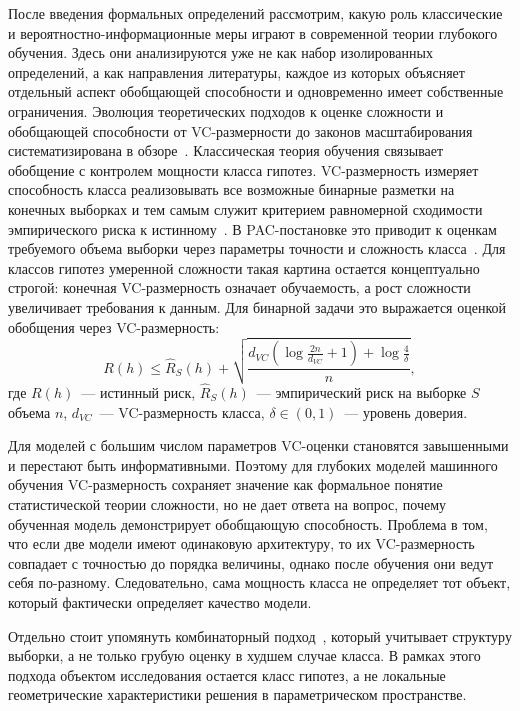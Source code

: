 После введения формальных определений рассмотрим, какую роль классические и вероятностно-информационные меры играют в современной теории глубокого обучения.
Здесь они анализируются уже не как набор изолированных определений, а как направления литературы, каждое из которых объясняет отдельный аспект обобщающей способности и одновременно имеет собственные ограничения.
Эволюция теоретических подходов к оценке сложности и обобщающей способности от VC-размерности до законов масштабирования систематизирована в обзоре~\cite{grabovoy2026vc}.
Классическая теория обучения связывает обобщение с контролем мощности класса гипотез.
VC-размерность измеряет способность класса реализовывать все возможные бинарные разметки на конечных выборках и тем самым служит критерием равномерной сходимости эмпирического риска к истинному~\cite{vapnik1974StatTheory}.
В PAC-постановке это приводит к оценкам требуемого объема выборки через параметры точности и сложность класса~\cite{valiant1984LearnableTheory}.
Для классов гипотез умеренной сложности такая картина остается концептуально строгой: конечная VC-размерность означает обучаемость, а рост сложности увеличивает требования к данным.
Для бинарной задачи это выражается оценкой обобщения через VC-размерность:
\begin{equation}
R(h)\le \hat R_S(h)+\sqrt{\frac{d_{VC}\!\left(\log\frac{2n}{d_{VC}}+1\right)+\log\frac{4}{\delta}}{n}},
\label{eq:ch0sv_vc_bound}
\end{equation}
где $R(h)$~--- истинный риск, $\hat R_S(h)$~--- эмпирический риск на выборке $S$ объема $n$, $d_{VC}$~--- VC-размерность класса, $\delta\in(0,1)$~--- уровень доверия.

Для моделей с большим числом параметров VC-оценки становятся завышенными и перестают быть информативными.
Поэтому для глубоких моделей машинного обучения VC-размерность сохраняет значение как формальное понятие статистической теории сложности, но не дает ответа на вопрос, почему обученная модель демонстрирует обобщающую способность.
Проблема в том, что если две модели имеют одинаковую архитектуру, то их VC-размерность совпадает с точностью до порядка величины, однако после обучения они ведут себя по-разному.
Следовательно, сама мощность класса не определяет тот объект, который фактически определяет качество модели.

Отдельно стоит упомянуть комбинаторный подход~\cite{vorontsov04qualdan}, который учитывает структуру выборки, а не только грубую оценку в худшем случае класса.
В рамках этого подхода объектом исследования остается класс гипотез, а не локальные геометрические характеристики решения в параметрическом пространстве.

